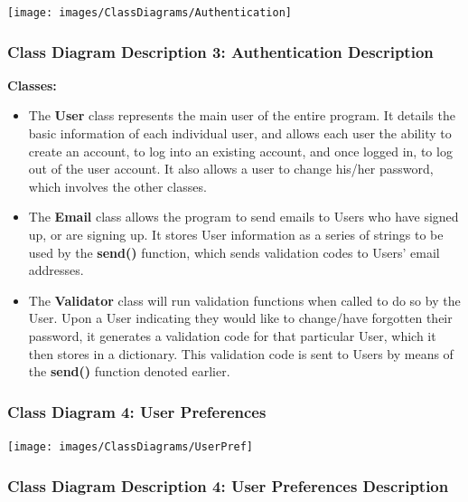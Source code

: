 \documentclass[twoside,letterpaper]{article}
\begin{document}
	\texttt{[image: images/ClassDiagrams/Authentication]}
	
	\newpage
	
	\subsubsection[Class Diagram Description 3: Authentication Description]{\rmfamily\bfseries\color{black}
		Class Diagram Description 3: Authentication Description}
	\hypertarget{RefHeading22059017292}{}
	
	\textbf{Classes:}
	\begin{itemize}
	
		\item The \textbf{User} class represents the main user of the entire program. It details the basic information of each individual user, and allows each user the ability to create an account, to log into an existing account, and once logged in, to log out of the user account. It also allows a user to change his/her password, which involves the other classes.
		\item The \textbf{Email} class allows the program to send emails to Users who have signed up, or are signing up. It stores User information as a series of strings to be used by the \textbf{send()} function, which sends validation codes to Users' email addresses.
		\item The \textbf{Validator} class will run validation functions when called to do so by the User. Upon a User indicating they would like to change/have forgotten their password, it generates a validation code for that particular User, which it then stores in a dictionary. This validation code is sent to Users by means of the \textbf{send()} function denoted earlier.
	\end{itemize}
	
	\newpage
	
	\subsubsection[Class Diagram 4: User Preferences]{\rmfamily\bfseries\color{black}
		Class Diagram 4: User Preferences}
	\hypertarget{RefHeading22059017292}{}
	\bigskip
	
	\texttt{[image: images/ClassDiagrams/UserPref]}
	
	\newpage
	
	\subsubsection[Class Diagram Description 4: User Preferences Description]{\rmfamily\bfseries\color{black}
		Class Diagram Description 4: User Preferences Description}
	\hypertarget{RefHeading22059017292}{}
	
\end{document}

